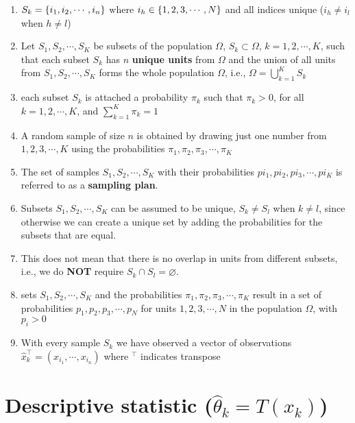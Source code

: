 \begin{enumerate}
    \item $S_k = \left\{i_1,i_2,\cdots,i_n\right\}$  where $i_h \in \left\{1, 2, 3,\cdots, N\right\}$ and all indices unique ($i_h \neq i_l$ when $h \neq l$)

    \item Let $S_1, S_2, \cdots, S_K$ be subsets of the population $\Omega$, $S_k \subset \Omega$, $k = 1, 2,\cdots, K$, such that each subset $S_k$ has $n$ \textbf{unique units} from $\Omega$ and the union of all units from $S_1, S_2,\cdots, S_K$ forms the whole population $\Omega$, i.e., ${\displaystyle \Omega = \bigcup_{k=1}^{K} S_k}$
    
    \item each subset $S_k$ is attached a probability $\pi_k$ such that $\pi_k > 0$, for all $k = 1, 2,\cdots, K$, and ${\displaystyle \sum_{k=1}^{K} \pi_k = 1}$

    \item A random sample of size $n$ is obtained by drawing just one number from $1, 2, 3,\cdots, K$ using the probabilities $\pi_1, \pi_2, \pi_3,\cdots,\pi_K$

    \item The set of samples $S_1, S_2,\cdots, S_K$ with their probabilities $pi_1, pi_2, pi_3,\cdots ,pi_K$ is referred to as a \textbf{sampling plan}.

    \item Subsets $S_1, S_2, \cdots, S_K$ can be assumed to be unique, $S_k \neq S_l$ when $k \neq l$, since otherwise we can create a unique set by adding the probabilities for the subsets that are equal.

    \item This does not mean that there is no overlap in units from different subsets, i.e., we do \textbf{NOT} require $S_k \cap S_l = \varnothing$.

    \item sets $S_1, S_2,\cdots, S_K$ and the probabilities $\pi_1, \pi_2, \pi_3,\cdots,\pi_K$ result in a set of probabilities $p_1, p_2, p_3,\cdots, p_N$ for units $1, 2, 3,\cdots, N$ in the population $\Omega$, with $p_i > 0$

    \item With every sample $S_k$ we have observed a vector of observations $\hat{x}_k^\top = (x_{i_1},\cdots,x_{i_n})$ where  $^\top$ indicates transpose

\end{enumerate}


\section{Descriptive statistic ($\hat{\theta}_k = T(x_k)$) \cite{ism-1}}\label{Descriptive statistic}

